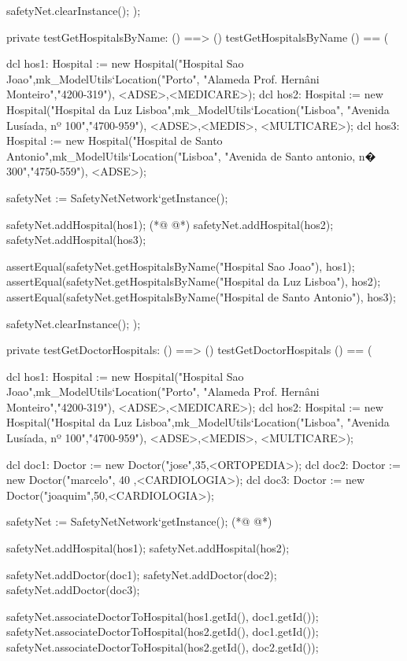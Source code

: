 \begin{vdmpp}[breaklines=true]
  safetyNet.clearInstance();
);

private testGetHospitalsByName: () ==> ()
 testGetHospitalsByName () == (
  
  dcl hos1: Hospital := new Hospital("Hospital Sao Joao",mk_ModelUtils`Location("Porto", "Alameda Prof. Hernâni Monteiro","4200-319"), {<ADSE>,<MEDICARE>});
  dcl hos2: Hospital := new Hospital("Hospital da Luz Lisboa",mk_ModelUtils`Location("Lisboa", "Avenida Lusíada, nº 100","4700-959"), {<ADSE>,<MEDIS>, <MULTICARE>});
  dcl hos3: Hospital := new Hospital("Hospital de Santo Antonio",mk_ModelUtils`Location("Lisboa", "Avenida de Santo antonio, n� 300","4750-559"), {<ADSE>});
  
  safetyNet := SafetyNetNetwork`getInstance();
   
  safetyNet.addHospital(hos1);
(*@
\label{testGetDoctorBySpecialtie:403}
@*)
  safetyNet.addHospital(hos2);
  safetyNet.addHospital(hos3);
 
  assertEqual(safetyNet.getHospitalsByName("Hospital Sao Joao"), {hos1});
  assertEqual(safetyNet.getHospitalsByName("Hospital da Luz Lisboa"), {hos2});
  assertEqual(safetyNet.getHospitalsByName("Hospital de Santo Antonio"), {hos3});
  
  safetyNet.clearInstance();
);

private testGetDoctorHospitals: () ==> ()
 testGetDoctorHospitals () == (
 
  dcl hos1: Hospital := new Hospital("Hospital Sao Joao",mk_ModelUtils`Location("Porto", "Alameda Prof. Hernâni Monteiro","4200-319"), {<ADSE>,<MEDICARE>});
  dcl hos2: Hospital := new Hospital("Hospital da Luz Lisboa",mk_ModelUtils`Location("Lisboa", "Avenida Lusíada, nº 100","4700-959"), {<ADSE>,<MEDIS>, <MULTICARE>});
  
  dcl doc1: Doctor := new Doctor("jose",35,<ORTOPEDIA>);
  dcl doc2: Doctor := new Doctor("marcelo", 40 ,<CARDIOLOGIA>);
  dcl doc3: Doctor := new Doctor("joaquim",50,<CARDIOLOGIA>);
  
  safetyNet := SafetyNetNetwork`getInstance();
(*@
\label{testGetHospitalSpecialties:424}
@*)
   
  safetyNet.addHospital(hos1);
  safetyNet.addHospital(hos2);
  
  safetyNet.addDoctor(doc1);
  safetyNet.addDoctor(doc2);
  safetyNet.addDoctor(doc3);

  safetyNet.associateDoctorToHospital(hos1.getId(), doc1.getId());
  safetyNet.associateDoctorToHospital(hos2.getId(), doc1.getId());
  safetyNet.associateDoctorToHospital(hos2.getId(), doc2.getId());


\end{vdmpp}
